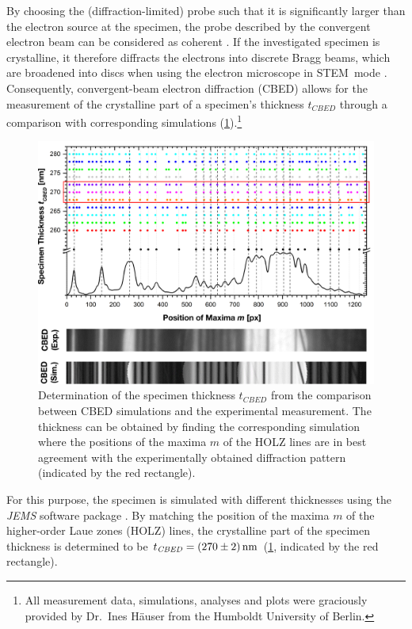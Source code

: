 By choosing the (diffraction-limited) probe such that it is significantly larger than the electron source at the specimen, the probe described by the convergent electron beam can be considered as coherent \cite{Hawkes2019,Williams2009}. If the investigated specimen is crystalline, it therefore diffracts the electrons into discrete Bragg beams, which are broadened into discs when using the electron microscope in STEM~mode \cite{Hawkes2019,Williams2009}.
\newpage
Consequently, convergent-beam electron diffraction (CBED) allows for the measurement of the crystalline part of a specimen's thickness $t_{\mathit{CBED}}$ through a comparison with corresponding simulations (\cref{fig:CBED-comparison-simulation-thickness}).\footnote{All measurement data, simulations, analyses and plots were graciously provided by Dr.~Ines Häuser from the Humboldt University of Berlin.}
\begin{figure}[H]
  \centering
  \includegraphics[width=\textwidth]{Figures/Specimen/pn-Junction/CBED-comparion-simulation-thickness.pdf}
  \caption{Determination of the specimen thickness $t_{\mathit{CBED}}$ from the comparison between CBED simulations and the experimental measurement. The thickness can be obtained by finding the corresponding simulation where the positions of the maxima $m$ of the HOLZ lines are in best agreement with the experimentally obtained diffraction pattern (indicated by the red rectangle).}
  \label{fig:CBED-comparison-simulation-thickness}
\end{figure}
For this purpose, the specimen is simulated with different thicknesses using the \emph{JEMS} software package \cite{JEMS}. By matching the position of the maxima $m$ of the higher-order Laue zones (HOLZ) lines, the crystalline part of the specimen thickness is determined to be $t_{\mathit{CBED}} = \SI{270 \pm 2}{\nm}$ (\cref{fig:CBED-comparison-simulation-thickness}, indicated by the red rectangle).
